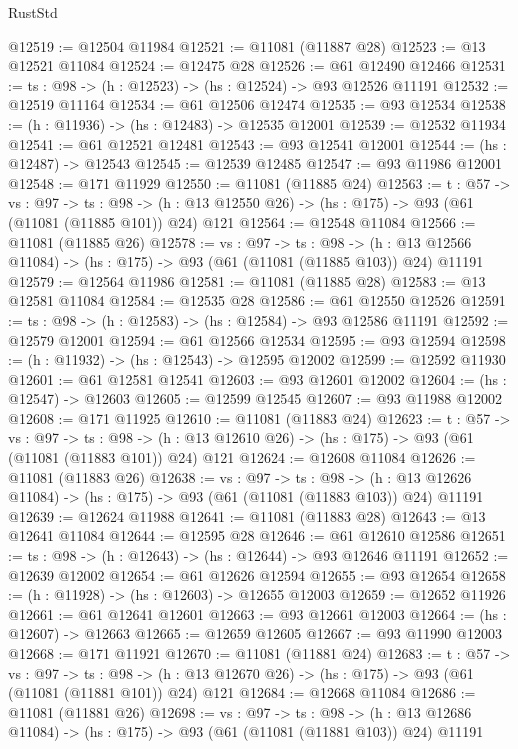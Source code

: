 \begin{lexlean}{RustStd}
\begin{coremodule}
@12519 := @12504 @11984
@12521 := @11081 (@11887 @28)
@12523 := @13 @12521 @11084
@12524 := @12475 @28
@12526 := @61 @12490 @12466
@12531 := {ts : @98} -> (h : @12523) -> (hs : @12524) -> @93 @12526 @11191
@12532 := @12519 @11164
@12534 := @61 @12506 @12474
@12535 := @93 @12534
@12538 := (h : @11936) -> (hs : @12483) -> @12535 @12001
@12539 := @12532 @11934
@12541 := @61 @12521 @12481
@12543 := @93 @12541 @12001
@12544 := (hs : @12487) -> @12543
@12545 := @12539 @12485
@12547 := @93 @11986 @12001
@12548 := @171 @11929
@12550 := @11081 (@11885 @24)
@12563 := {t : @57} ->
  {vs : @97} ->
  {ts : @98} -> (h : @13 @12550 @26) -> (hs : @175) -> @93 (@61 (@11081 (@11885 @101)) @24) @121
@12564 := @12548 @11084
@12566 := @11081 (@11885 @26)
@12578 := {vs : @97} ->
  {ts : @98} ->
  (h : @13 @12566 @11084) -> (hs : @175) -> @93 (@61 (@11081 (@11885 @103)) @24) @11191
@12579 := @12564 @11986
@12581 := @11081 (@11885 @28)
@12583 := @13 @12581 @11084
@12584 := @12535 @28
@12586 := @61 @12550 @12526
@12591 := {ts : @98} -> (h : @12583) -> (hs : @12584) -> @93 @12586 @11191
@12592 := @12579 @12001
@12594 := @61 @12566 @12534
@12595 := @93 @12594
@12598 := (h : @11932) -> (hs : @12543) -> @12595 @12002
@12599 := @12592 @11930
@12601 := @61 @12581 @12541
@12603 := @93 @12601 @12002
@12604 := (hs : @12547) -> @12603
@12605 := @12599 @12545
@12607 := @93 @11988 @12002
@12608 := @171 @11925
@12610 := @11081 (@11883 @24)
@12623 := {t : @57} ->
  {vs : @97} ->
  {ts : @98} -> (h : @13 @12610 @26) -> (hs : @175) -> @93 (@61 (@11081 (@11883 @101)) @24) @121
@12624 := @12608 @11084
@12626 := @11081 (@11883 @26)
@12638 := {vs : @97} ->
  {ts : @98} ->
  (h : @13 @12626 @11084) -> (hs : @175) -> @93 (@61 (@11081 (@11883 @103)) @24) @11191
@12639 := @12624 @11988
@12641 := @11081 (@11883 @28)
@12643 := @13 @12641 @11084
@12644 := @12595 @28
@12646 := @61 @12610 @12586
@12651 := {ts : @98} -> (h : @12643) -> (hs : @12644) -> @93 @12646 @11191
@12652 := @12639 @12002
@12654 := @61 @12626 @12594
@12655 := @93 @12654
@12658 := (h : @11928) -> (hs : @12603) -> @12655 @12003
@12659 := @12652 @11926
@12661 := @61 @12641 @12601
@12663 := @93 @12661 @12003
@12664 := (hs : @12607) -> @12663
@12665 := @12659 @12605
@12667 := @93 @11990 @12003
@12668 := @171 @11921
@12670 := @11081 (@11881 @24)
@12683 := {t : @57} ->
  {vs : @97} ->
  {ts : @98} -> (h : @13 @12670 @26) -> (hs : @175) -> @93 (@61 (@11081 (@11881 @101)) @24) @121
@12684 := @12668 @11084
@12686 := @11081 (@11881 @26)
@12698 := {vs : @97} ->
  {ts : @98} ->
  (h : @13 @12686 @11084) -> (hs : @175) -> @93 (@61 (@11081 (@11881 @103)) @24) @11191

\end{coremodule}
\end{lexlean}
